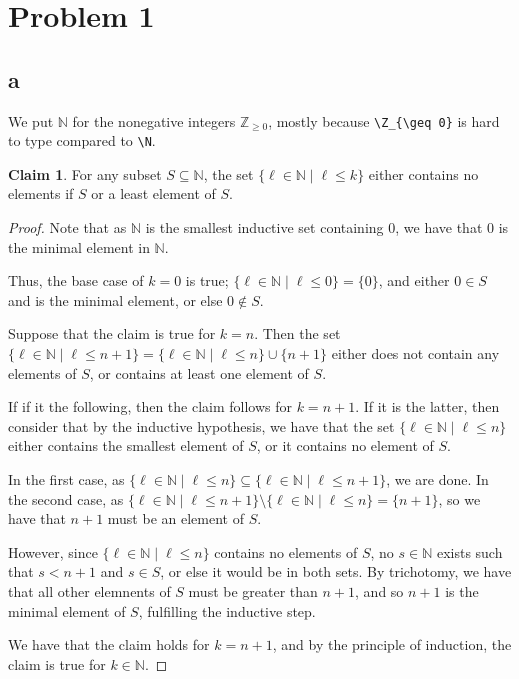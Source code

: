 \documentclass[12pt,letterpaper]{article}
\theoremstyle{definition}
\newtheorem*{claim}{Claim}
\newcommand{\Z}{\mathbb{Z}}
\newcommand{\N}{\mathbb{N}}
\begin{document}
\section*{Problem 1}
\subsection*{a}

We put $\N$ for the nonegative integers $\Z_{\geq 0}$, mostly because
\verb#\Z_{\geq 0}# is hard to type compared to \verb#\N#.

\begin{claim}
    For any subset $S \subseteq \N$, the set $\{\ell \in \N \mid \ell \leq k\}$
    either contains no elements if $S$ or a least element of $S$.
\end{claim}

\begin{proof}
    Note that as $\N$ is the smallest inductive set containing $0$, 
    we have that $0$ is the minimal element in $\N$.

    Thus, the base case of $k = 0$ is true; $\{\ell \in \N \mid \ell \leq 0\} = \{0\}$, and
    either $0 \in S$ and is the minimal element, or else $0 \notin S$.

    Suppose that the claim is true for $k = n$. 
    Then the set $\{\ell \in \N \mid \ell \leq n+1\} = \{\ell \in \N \mid \ell \leq n\} \cup \{n+1\}$ 
    either does not contain any elements of $S$, or contains at least one element of $S$.

    If if it the following, then the claim follows for $k = n+1$. 
    If it is the latter, then consider that by the inductive hypothesis, we have that
    the set $\{\ell \in \N \mid \ell \leq n\}$ either contains the smallest element of $S$,
    or it contains no element of $S$. 

    In the first case, as $\{\ell \in \N \mid \ell \leq n\} \subseteq \{\ell \in \N \mid \ell \leq n+1\}$,
    we are done. In the second case, as $\{\ell \in \N \mid \ell \leq n+1\} \setminus \{\ell \in \N \mid \ell \leq n\} = \{n+1\}$,
    so we have that $n+1$ must be an element of $S$.

    However, since $\{\ell \in \N \mid \ell \leq n\}$ contains no elements of $S$,
    no $s \in \N$ exists such that $s < n+1$ and $s \in S$, or else it would be in both sets.
    By trichotomy, we have that all other elemnents of $S$ must be greater than $n+1$,
    and so $n+1$ is the minimal element of $S$, fulfilling the inductive step.

    We have that the claim holds for $k = n+1$, and by the principle of induction, 
    the claim is true for $k \in \N$.
\end{proof}
\end{document}
